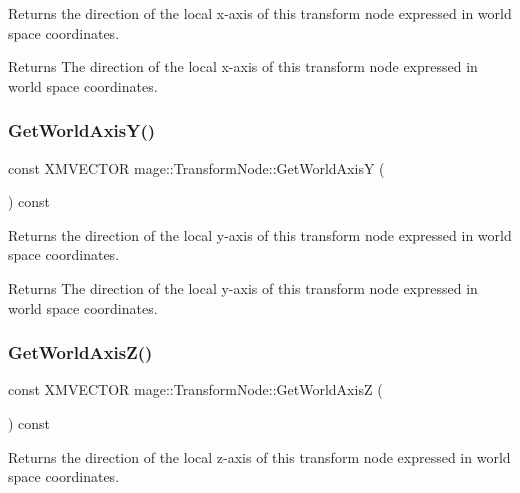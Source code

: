 Returns the direction of the local x-\/axis of this transform node expressed in world space coordinates.

\begin{DoxyReturn}{Returns}
The direction of the local x-\/axis of this transform node expressed in world space coordinates. 
\end{DoxyReturn}
\hypertarget{classmage_1_1_transform_node_a13b1b983327adec0f2960e4388d2e6a7}{}\label{classmage_1_1_transform_node_a13b1b983327adec0f2960e4388d2e6a7} 
\subsubsection{\texorpdfstring{Get\+World\+Axis\+Y()}{GetWorldAxisY()}}
{\footnotesize\ttfamily const X\+M\+V\+E\+C\+T\+OR mage\+::\+Transform\+Node\+::\+Get\+World\+AxisY (\begin{DoxyParamCaption}{ }\end{DoxyParamCaption}) const}

Returns the direction of the local y-\/axis of this transform node expressed in world space coordinates.

\begin{DoxyReturn}{Returns}
The direction of the local y-\/axis of this transform node expressed in world space coordinates. 
\end{DoxyReturn}
\hypertarget{classmage_1_1_transform_node_a932c9e84dd8b48d634d7c9f7315100e1}{}\label{classmage_1_1_transform_node_a932c9e84dd8b48d634d7c9f7315100e1} 
\subsubsection{\texorpdfstring{Get\+World\+Axis\+Z()}{GetWorldAxisZ()}}
{\footnotesize\ttfamily const X\+M\+V\+E\+C\+T\+OR mage\+::\+Transform\+Node\+::\+Get\+World\+AxisZ (\begin{DoxyParamCaption}{ }\end{DoxyParamCaption}) const}

Returns the direction of the local z-\/axis of this transform node expressed in world space coordinates.

